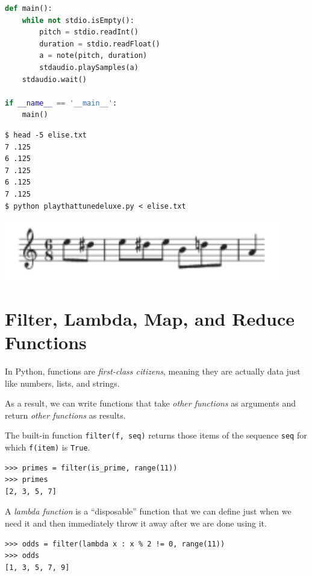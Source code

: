 \documentclass[8pt,a4paper,compress,handout]{beamer}
\begin{document}
\begin{frame}[fragile]
\begin{lstlisting}[language=Python]
def main():
    while not stdio.isEmpty():
        pitch = stdio.readInt()
        duration = stdio.readFloat()
        a = note(pitch, duration)
        stdaudio.playSamples(a)
    stdaudio.wait()

if __name__ == '__main__':
    main()
\end{lstlisting}

\begin{minipage}{170pt}
\begin{lstlisting}[language={}]
$ head -5 elise.txt
7 .125 
6 .125 
7 .125 
6 .125 
7 .125 
$ python playthattunedeluxe.py < elise.txt
\end{lstlisting}
\end{minipage}%
\begin{minipage}{130pt}
\hfill \includegraphics[scale=0.5]{figures/furelise.pdf}
\end{minipage}
\end{frame}

\section{Filter, Lambda, Map, and Reduce Functions}
\begin{frame}[fragile]
In Python, functions are \emph{first-class citizens}, meaning they are actually data just like numbers, lists, and strings.

\bigskip

As a result, we can write functions that take \emph{other functions} as arguments and return \emph{other functions} as results.

\bigskip

The built-in function \lstinline{filter(f, seq)} returns those items of the sequence \lstinline{seq} for which \lstinline{f(item)} is \lstinline{True}. 
\begin{lstlisting}[language={}]
>>> primes = filter(is_prime, range(11))
>>> primes
[2, 3, 5, 7]
\end{lstlisting}

\bigskip

A \emph{lambda function} is a ``disposable'' function that we can define just when we need it and then immediately throw it away after we are done using it. 
\begin{lstlisting}[language={}]
>>> odds = filter(lambda x : x % 2 != 0, range(11))
>>> odds
[1, 3, 5, 7, 9]
\end{lstlisting}
\end{frame}
\end{document}
